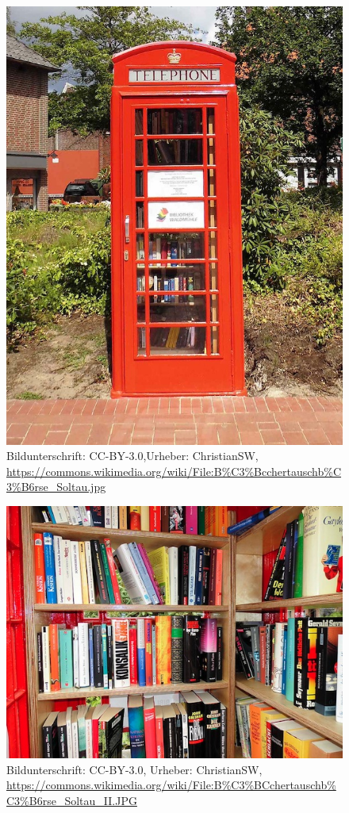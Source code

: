 \documentclass[a4paper,
fontsize=11pt,
oneside,
numbers=noperiodatend,
parskip=half-,
bibliography=totoc,
final
]{scrartcl}
\begin{document}
\begin{figure}[htbp]
\centering
\includegraphics{img/BuchertauschborseSoltau.jpg}
\caption{Bildunterschrift: CC-BY-3.0,Urheber: ChristianSW,
\url{https://commons.wikimedia.org/wiki/File:B\%C3\%Bcchertauschb\%C3\%B6rse_Soltau.jpg}}
\end{figure}

\begin{figure}[htbp]
\centering
\includegraphics{img/BuchertauschborseSoltauII.jpg}
\caption{Bildunterschrift: CC-BY-3.0, Urheber: ChristianSW,
\url{https://commons.wikimedia.org/wiki/File:B\%C3\%BCchertauschb\%C3\%B6rse_Soltau_II.JPG}}
\end{figure}
\end{document}
